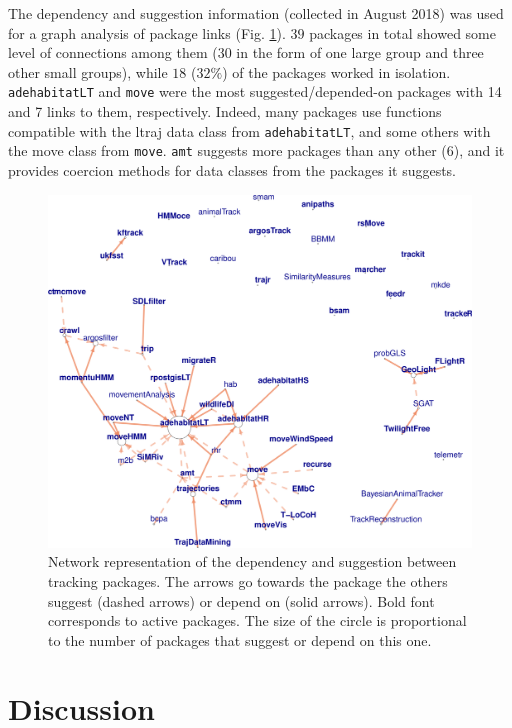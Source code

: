 \documentclass[a4paper,12pt]{article}
\newcommand{\Rpkg}[1]{\texttt{#1}}
\begin{document}
The dependency and suggestion information (collected in August 2018) was used for a graph analysis of package links (Fig. \ref{fig:NetImpSuggMov}). $39$ packages in total showed some level of connections among them ($30$ in the form of one large group and three other small groups), while $18$ ($32\%$) of the packages worked in isolation. \Rpkg{adehabitatLT} and \Rpkg{move} were the most suggested/depended-on packages with 14 and 7 links to them, respectively. Indeed, many packages use functions compatible with the ltraj data class from \Rpkg{adehabitatLT}, and some others with the move class from \Rpkg{move}. \Rpkg{amt} suggests more packages than any other (6), and it provides coercion methods for data classes from the packages it suggests. 


\begin{figure}
	\centering
	\includegraphics[width=1\textwidth]{./mes_images/NetworkImportSuggestTrack2.pdf}
	\caption{\label{fig:NetImpSuggMov} Network representation of the dependency and suggestion between tracking packages. The arrows go towards the package the others suggest (dashed arrows) or depend on (solid arrows). Bold font corresponds to active packages. The size of the circle is proportional to the number of packages that suggest or depend on this one.}
\end{figure}

\section*{Discussion}
%
%
\end{document}

